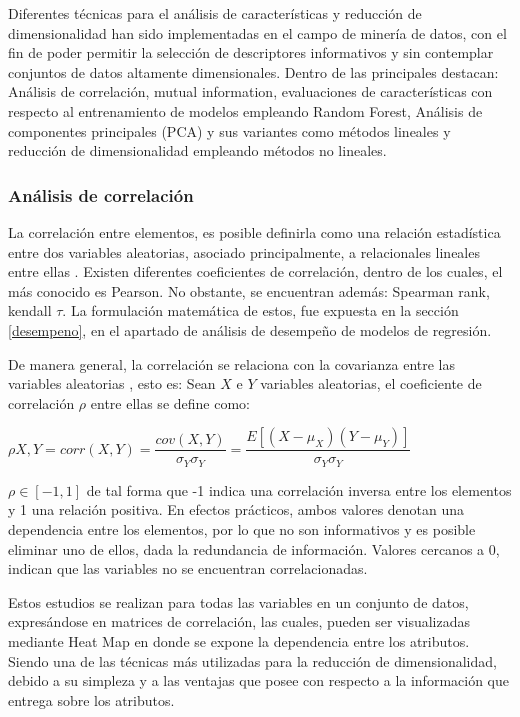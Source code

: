 Diferentes técnicas para el análisis de características y reducción de dimensionalidad han sido implementadas en el campo de minería de datos, con el fin de poder permitir la selección de descriptores informativos y sin contemplar conjuntos de datos altamente dimensionales. Dentro de las principales destacan: Análisis de correlación, mutual information, evaluaciones de características con respecto al entrenamiento de modelos empleando Random Forest, Análisis de componentes principales (PCA) y sus variantes como métodos lineales y reducción de dimensionalidad empleando métodos no lineales. 

\subsubsection{Análisis de correlación}

La correlación entre elementos, es posible definirla como una relación estadística entre dos variables aleatorias, asociado principalmente, a relacionales lineales entre ellas \cite{cohen2014applied}. Existen diferentes coeficientes de correlación, dentro de los cuales, el más conocido es Pearson. No obstante, se encuentran además: Spearman rank, kendall $\tau$. La formulación matemática de estos, fue expuesta en la sección \ref{desempeno}, en el apartado de análisis de desempeño de modelos de regresión.

De manera general, la correlación se relaciona con la covarianza entre las variables aleatorias \cite{cohen2014applied}, esto es: Sean $X$ e $Y$ variables aleatorias, el coeficiente de correlación $\rho$ entre ellas se define como:

\begin{center}
	$\rho X,Y = corr(X,Y) = \dfrac{cov(X,Y)}{\sigma_{Y}\sigma_{Y}} = \dfrac{E[(X - \mu_{X})(Y - \mu_{Y})]}{\sigma_{Y}\sigma_{Y}}$
\end{center}

$\rho \in [-1, 1]$ de tal forma que -1 indica una correlación inversa entre los elementos y 1 una relación positiva. En efectos prácticos, ambos valores denotan una dependencia entre los elementos, por lo que no son informativos y es posible eliminar uno de ellos, dada la redundancia de información. Valores cercanos a 0, indican que las variables no se encuentran correlacionadas.

Estos estudios se realizan para todas las variables en un conjunto de datos, expresándose en matrices de correlación, las cuales, pueden ser visualizadas mediante Heat Map en donde se expone la dependencia entre los atributos. Siendo una de las técnicas más utilizadas para la reducción de dimensionalidad, debido a su simpleza y a las ventajas que posee con respecto a la información que entrega sobre los atributos.

